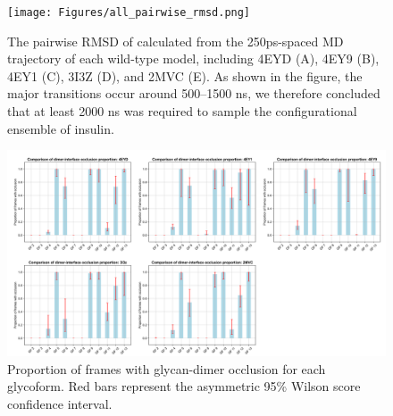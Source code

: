 \documentclass[9pt]{elife}
\begin{document}
\renewcommand{\thefigure}{S\arabic{figure}}
\begin{figure}[H]
\centering
\texttt{[image: Figures/all\_pairwise\_rmsd.png]}
\caption{The pairwise RMSD of calculated from the 250ps-spaced MD trajectory of each wild-type model, including 4EYD (A), 4EY9 (B), 4EY1 (C), 3I3Z (D), and 2MVC (E). As shown in the figure, the major transitions occur around 500--1500 ns, we therefore concluded that at least 2000 ns was required to sample the configurational ensemble of insulin.}
\label{supple_fig: pairwise_rmsd}
\end{figure}



\renewcommand{\thefigure}{S\arabic{figure}}
\begin{figure}[H]
\centering
\includegraphics[width=1.0\textwidth]{Figures/occlusion_proportion_models_2.png}
\caption{Proportion of frames with glycan-dimer occlusion for each glycoform. Red bars represent the asymmetric 95\% Wilson score confidence interval.}
\label{supple_fig: occlusion_binomial}
\end{figure}
\end{document}
